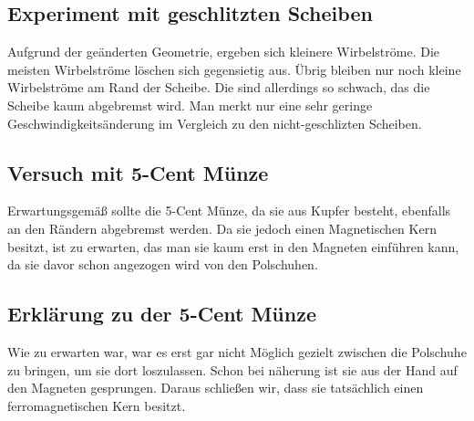 \documentclass[a4paper,twoside,12pt,DIV=13,BCOR=5mm,numbers=noenddot,cleardoublepage=empty]{scrbook}
\begin{document}
        \subsection{Experiment mit geschlitzten Scheiben}
        Aufgrund der ge\"anderten Geometrie, ergeben sich kleinere Wirbelstr\"ome. Die meisten Wirbelstr\"ome l\"oschen sich gegensietig aus. \"Ubrig bleiben nur noch kleine Wirbelstr\"ome am Rand der Scheibe. Die sind allerdings so schwach, das die Scheibe kaum abgebremst wird. Man merkt nur eine sehr geringe Geschwindigkeits\"anderung im Vergleich zu den nicht-geschlizten Scheiben.
        \subsection{Versuch mit 5-Cent M\"unze}
        Erwartungsgem\"a\ss{} sollte die 5-Cent M\"unze, da sie aus Kupfer besteht, ebenfalls an den R\"andern abgebremst werden. Da sie jedoch einen Magnetischen Kern besitzt, ist zu erwarten, das man sie kaum erst in den Magneten einf\"uhren kann, da sie davor schon angezogen wird von den Polschuhen.
        \subsection{Erkl\"arung zu der 5-Cent M\"unze}
        Wie zu erwarten war, war es erst gar nicht M\"oglich gezielt zwischen die Polschuhe zu bringen, um sie dort loszulassen. Schon bei n\"aherung ist sie aus der Hand auf den Magneten gesprungen. Daraus schlie\ss{}en wir, dass sie tats\"achlich einen ferromagnetischen Kern besitzt.
\end{document}
